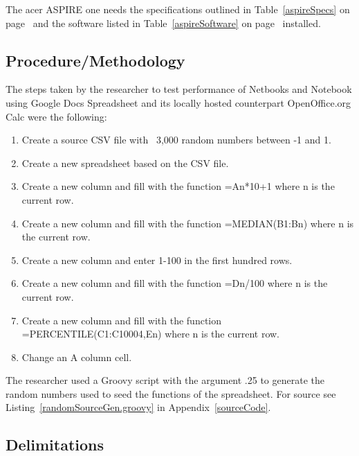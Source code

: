 The acer ASPIRE one needs the specifications outlined in Table~\ref{aspireSpecs}
on page~\pageref{aspireSpecs} and the software listed in
Table~\ref{aspireSoftware} on page~\pageref{aspireSoftware} installed.









\subsection{Procedure/Methodology}


The steps taken by the researcher to test performance of Netbooks and Notebook
using Google Docs Spreadsheet and its locally hosted counterpart OpenOffice.org
Calc were the following:

\begin{enumerate}
\item Create a source CSV file with ~3,000 random numbers between -1 and 1.
\item Create a new spreadsheet based on the CSV file.
\item Create a new column and fill with the function =An*10+1 where n is the
  current row.
\item Create a new column and fill with the function =MEDIAN(B1:Bn) where n is
  the current row.
\item Create a new column and enter 1-100 in the first hundred rows.
\item Create a new column and fill with the function =Dn/100 where n is the
  current row.
\item Create a new column and fill with the function =PERCENTILE(C1:C10004,En)
  where n is the current row.
\item Change an A column cell.
\end{enumerate}

The researcher used a Groovy script with the argument .25 to generate the random
numbers used to seed the functions of the spreadsheet.  For source
see Listing~\ref{randomSourceGen.groovy} in Appendix~\ref{sourceCode}.

\subsection{Delimitations}


